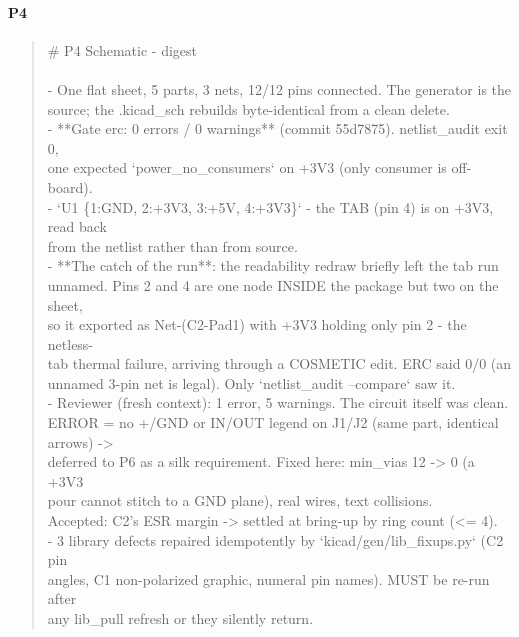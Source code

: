 \documentclass[11pt,a4paper]{article}
\begin{document}
\paragraph*{P4}
\begin{quote}\small\ttfamily\raggedright
\# P4 Schematic - digest\\
~\\
- One flat sheet, 5 parts, 3 nets, 12/12 pins connected. The generator is the\\
  source; the .kicad\_sch rebuilds byte-identical from a clean delete.\\
- {*}{*}Gate erc: 0 errors / 0 warnings{*}{*} (commit 55d7875). netlist\_audit exit 0,\\
  one expected `power\_no\_consumers` on +3V3 (only consumer is off-board).\\
- `U1 \{1:GND, 2:+3V3, 3:+5V, 4:+3V3\}` - the TAB (pin 4) is on +3V3, read back\\
  from the netlist rather than from source.\\
- {*}{*}The catch of the run{*}{*}: the readability redraw briefly left the tab run\\
  unnamed. Pins 2 and 4 are one node INSIDE the package but two on the sheet,\\
  so it exported as Net-(C2-Pad1) with +3V3 holding only pin 2 - the netless-\\
  tab thermal failure, arriving through a COSMETIC edit. ERC said 0/0 (an\\
  unnamed 3-pin net is legal). Only `netlist\_audit --compare` saw it.\\
- Reviewer (fresh context): 1 error, 5 warnings. The circuit itself was clean.\\
  ERROR = no +/GND or IN/OUT legend on J1/J2 (same part, identical arrows) -\textgreater{}\\
  deferred to P6 as a silk requirement. Fixed here: min\_vias 12 -\textgreater{} 0 (a +3V3\\
  pour cannot stitch to a GND plane), real wires, text collisions.\\
  Accepted: C2's ESR margin -\textgreater{} settled at bring-up by ring count (\textless{}= 4).\\
- 3 library defects repaired idempotently by `kicad/gen/lib\_fixups.py` (C2 pin\\
  angles, C1 non-polarized graphic, numeral pin names). MUST be re-run after\\
  any lib\_pull refresh or they silently return.
\end{quote}
\end{document}
